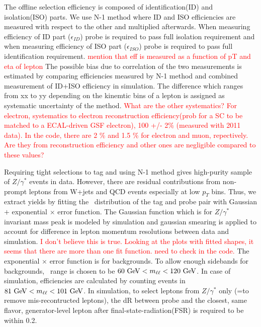 The offline selection efficiency is composed of identification(ID) and isolation(ISO) parts. 
We use N-1 method where ID and ISO efficiencies are measured with respect to the other 
and multiplied afterwards. When measuring efficiency of ID part ($\epsilon_{ID}$) 
probe is required to pass full isolation requirement and when measuring efficiency of 
ISO part ($\epsilon_{ISO}$) probe is required to pass full identification requirement. 
\textcolor{red}{mention that eff is measured as a function of pT and eta of lepton}   
The possible bias due to correlation of the two measurements 
is estimated by comparing efficiencies measured by N-1 method and combined measurement 
of ID+ISO  efficiency in simulation. The difference which ranges from xx to yy depending 
on the kinemtic bins of a lepton is assigned as systematic uncertainty of the method. 
\textcolor{red}{What are the other systematics? For electron, systematics to 
electron reconstruction efficiency(prob for a SC to be matched to a ECAL-driven 
GSF electron), 100 +/- 2\% (measured with 2011 data). In the code, there are 
2 \% and 1.5 \% for electron and muon, repectively. Are they from 
reconstruction efficiency and other ones are negligible compared to these values?} 

Requiring tight selections to tag and using N-1 method gives high-purity sample 
of $Z/\gamma^*$ events in data. However, there are residual contributions from 
non-prompt leptons from W+jets and QCD events especially at low $p_T$ bins. 
Thus, we extract yields by fitting the \mll~distribution of the tag and probe pair
with Gaussian $+$ exponential $\times$ error function. The Gaussian function which 
is for $Z/\gamma^*$ invariant mass peak is modeled by simulation and 
gaussian smearing is applied to account for difference in lepton momentum resolutions
between data and simulation. 
\textcolor{red}{I don't believe this is true. Looking at the plots with fitted shapes, 
it seems that there are more than one fit function. need to check in the code.}
The exponential $\times$ error function is for backgrounds.
To allow enough sidebands for backgrounds, \mll~range is chosen to be 
$60~\mathrm{Ge\kern -0.1em V} < m_{\ell\ell} < 120~\mathrm{Ge\kern -0.1em V}$. In case of simulation, efficiencies are calculated by 
counting events in $81~\mathrm{Ge\kern -0.1em V} < m_{\ell\ell} < 101~\mathrm{Ge\kern -0.1em V}$. In simulation, to select  
leptons from $Z/\gamma^*$ only (=to remove mis-recontructed leptons), the dR between 
probe and the closest, same flavor, generator-level lepton after final-state-radiation(FSR)
is required to be within 0.2.

